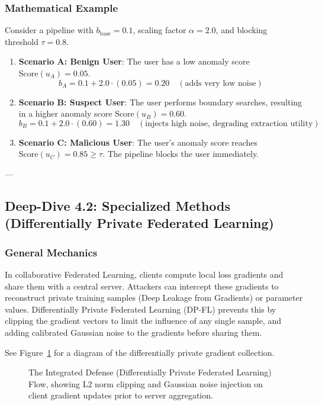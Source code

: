 \documentclass{article}
\begin{document}
\subsubsection{Mathematical Example}
Consider a pipeline with $b_{\text{base}} = 0.1$, scaling factor $\alpha = 2.0$, and blocking threshold $\tau = 0.8$.
\begin{enumerate}
    \item \textbf{Scenario A: Benign User}: The user has a low anomaly score $\text{Score}(u_A) = 0.05$.
    $$b_A = 0.1 + 2.0 \cdot (0.05) = 0.20 \quad (\text{adds very low noise})$$
    
    \item \textbf{Scenario B: Suspect User}: The user performs boundary searches, resulting in a higher anomaly score $\text{Score}(u_B) = 0.60$.
    $$b_B = 0.1 + 2.0 \cdot (0.60) = 1.30 \quad (\text{injects high noise, degrading extraction utility})$$
    
    \item \textbf{Scenario C: Malicious User}: The user's anomaly score reaches $\text{Score}(u_C) = 0.85 \ge \tau$. The pipeline blocks the user immediately.
\end{enumerate}

---

\subsection{Deep-Dive 4.2: Specialized Methods (Differentially Private Federated Learning)}

\subsubsection{General Mechanics}
In collaborative Federated Learning, clients compute local loss gradients and share them with a central server. Attackers can intercept these gradients to reconstruct private training samples (Deep Leakage from Gradients) or parameter values. Differentially Private Federated Learning (DP-FL) prevents this by clipping the gradient vectors to limit the influence of any single sample, and adding calibrated Gaussian noise to the gradients before sharing them.

See Figure~\ref{fig:integrated_defense} for a diagram of the differentially private gradient collection.

\begin{figure}[htbp]
    \centering
    \caption{The Integrated Defense (Differentially Private Federated Learning) Flow, showing L2 norm clipping and Gaussian noise injection on client gradient updates prior to server aggregation.}
    \label{fig:integrated_defense}
\end{figure}
\end{document}
